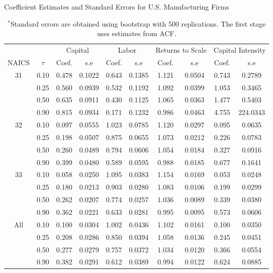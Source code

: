 \documentclass[12pt]{article}
\begin{document}
\begin{table}[H]
\centering
\caption{Coefficient Estimates and Standard Errors for U.S. Manufacturing Firms}
\small
\begin{tabular}{cccccccccc}
  \hline\hline & & \multicolumn{2}{c}{Capital}  & \multicolumn{2}{c}{Labor} & \multicolumn{2}{c}{Returns to Scale} & \multicolumn{2}{c}{Capital Intensity}\\ \cmidrule(lr){3-4} \cmidrule(lr){5-6} \cmidrule(lr){7-8} \cmidrule(lr){9-10}NAICS & $\tau$ & Coef. & s.e & Coef. & s.e & Coef. & s.e & Coef. & s.e \\ 
  \hline
31 & 0.10 & 0.478 & 0.1022 & 0.643 & 0.1385 & 1.121 & 0.0504 & 0.743 & 0.2789 \\ 
   & 0.25 & 0.560 & 0.0939 & 0.532 & 0.1192 & 1.092 & 0.0399 & 1.053 & 0.3465 \\ 
   & 0.50 & 0.635 & 0.0911 & 0.430 & 0.1125 & 1.065 & 0.0363 & 1.477 & 0.5403 \\ 
   & 0.90 & 0.815 & 0.0934 & 0.171 & 0.1232 & 0.986 & 0.0463 & 4.755 & 224.0343 \\ 
  32 & 0.10 & 0.097 & 0.0555 & 1.023 & 0.0785 & 1.120 & 0.0297 & 0.095 & 0.0635 \\ 
   & 0.25 & 0.198 & 0.0507 & 0.875 & 0.0655 & 1.073 & 0.0212 & 0.226 & 0.0783 \\ 
   & 0.50 & 0.260 & 0.0489 & 0.794 & 0.0606 & 1.054 & 0.0184 & 0.327 & 0.0916 \\ 
   & 0.90 & 0.399 & 0.0480 & 0.589 & 0.0595 & 0.988 & 0.0185 & 0.677 & 0.1641 \\ 
  33 & 0.10 & 0.058 & 0.0250 & 1.095 & 0.0383 & 1.154 & 0.0169 & 0.053 & 0.0248 \\ 
   & 0.25 & 0.180 & 0.0213 & 0.903 & 0.0280 & 1.083 & 0.0106 & 0.199 & 0.0299 \\ 
   & 0.50 & 0.262 & 0.0207 & 0.774 & 0.0257 & 1.036 & 0.0089 & 0.339 & 0.0380 \\ 
   & 0.90 & 0.362 & 0.0221 & 0.633 & 0.0281 & 0.995 & 0.0095 & 0.573 & 0.0606 \\ 
  All & 0.10 & 0.100 & 0.0304 & 1.002 & 0.0436 & 1.102 & 0.0161 & 0.100 & 0.0350 \\ 
   & 0.25 & 0.208 & 0.0286 & 0.850 & 0.0394 & 1.058 & 0.0136 & 0.245 & 0.0451 \\ 
   & 0.50 & 0.277 & 0.0279 & 0.757 & 0.0372 & 1.034 & 0.0120 & 0.366 & 0.0554 \\ 
   & 0.90 & 0.382 & 0.0291 & 0.612 & 0.0389 & 0.994 & 0.0122 & 0.624 & 0.0885 \\ 
   \hline
\end{tabular}
\caption*{\footnotesize $^{*}$Standard errors are obtained using bootstrap with 500 replications. The first stage uses estimates from ACF.}
\label{USQACF}
\end{table}
\end{document}
